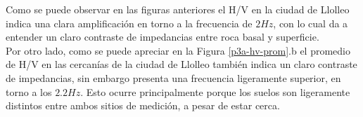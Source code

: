 Como se puede observar en las figuras anteriores el H/V en la ciudad de Llolleo indica una clara amplificación en torno a la frecuencia de $2Hz$, con lo cual da a entender un claro contraste de impedancias entre roca basal y superficie. \\

Por otro lado, como se puede apreciar en la Figura \ref{p3a-hv-prom}.b el promedio de H/V en las cercanías de la ciudad de Llolleo también indica un claro contraste de impedancias, sin embargo presenta una frecuencia ligeramente superior, en torno a los $2.2Hz$. Esto ocurre principalmente porque los suelos son ligeramente distintos entre ambos sitios de medición, a pesar de estar cerca.